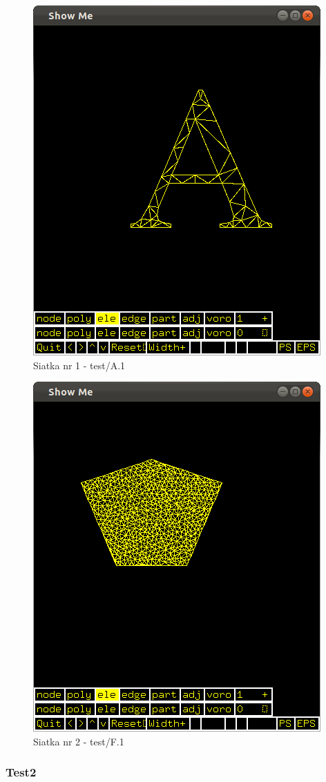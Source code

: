 \documentclass[a4paper,12pt,twoside]{article}
\begin{document}
\begin{center}
\begin{figure}[c]
	\includegraphics[scale=0.5]{img/A1.png}
	\caption{Siatka nr 1 - test/A.1}
\end{figure}

\begin{figure}[c]
	\includegraphics[scale=0.5]{img/F1.png}
	\caption{Siatka nr 2 - test/F.1}
\end{figure}

\end{center}

\subsubsection{Test2}
\end{document}
